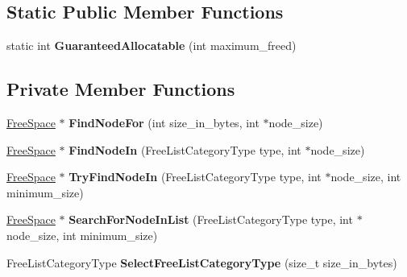 \subsection*{Static Public Member Functions}
\begin{DoxyCompactItemize}
\item 
static int {\bfseries Guaranteed\+Allocatable} (int maximum\+\_\+freed)\hypertarget{classv8_1_1internal_1_1_free_list_a07d00a5d5debb017bd0fcbdb905f49e4}{}\label{classv8_1_1internal_1_1_free_list_a07d00a5d5debb017bd0fcbdb905f49e4}

\end{DoxyCompactItemize}
\subsection*{Private Member Functions}
\begin{DoxyCompactItemize}
\item 
\hyperlink{classv8_1_1internal_1_1_free_space}{Free\+Space} $\ast$ {\bfseries Find\+Node\+For} (int size\+\_\+in\+\_\+bytes, int $\ast$node\+\_\+size)\hypertarget{classv8_1_1internal_1_1_free_list_a098331a33116801cc1483b999ac0baf3}{}\label{classv8_1_1internal_1_1_free_list_a098331a33116801cc1483b999ac0baf3}

\item 
\hyperlink{classv8_1_1internal_1_1_free_space}{Free\+Space} $\ast$ {\bfseries Find\+Node\+In} (Free\+List\+Category\+Type type, int $\ast$node\+\_\+size)\hypertarget{classv8_1_1internal_1_1_free_list_ada84f3304774b6c622055148888804c2}{}\label{classv8_1_1internal_1_1_free_list_ada84f3304774b6c622055148888804c2}

\item 
\hyperlink{classv8_1_1internal_1_1_free_space}{Free\+Space} $\ast$ {\bfseries Try\+Find\+Node\+In} (Free\+List\+Category\+Type type, int $\ast$node\+\_\+size, int minimum\+\_\+size)\hypertarget{classv8_1_1internal_1_1_free_list_a5dfed4fae86d7c08a9c3fef340c8fe85}{}\label{classv8_1_1internal_1_1_free_list_a5dfed4fae86d7c08a9c3fef340c8fe85}

\item 
\hyperlink{classv8_1_1internal_1_1_free_space}{Free\+Space} $\ast$ {\bfseries Search\+For\+Node\+In\+List} (Free\+List\+Category\+Type type, int $\ast$node\+\_\+size, int minimum\+\_\+size)\hypertarget{classv8_1_1internal_1_1_free_list_aa5bb3a0fa3d34b0b669adb5e34ad7ee1}{}\label{classv8_1_1internal_1_1_free_list_aa5bb3a0fa3d34b0b669adb5e34ad7ee1}

\item 
Free\+List\+Category\+Type {\bfseries Select\+Free\+List\+Category\+Type} (size\+\_\+t size\+\_\+in\+\_\+bytes)\hypertarget{classv8_1_1internal_1_1_free_list_ab700181c8e4335652ed6e9abf1fdd6a9}{}\label{classv8_1_1internal_1_1_free_list_ab700181c8e4335652ed6e9abf1fdd6a9}


\end{DoxyCompactItemize}
